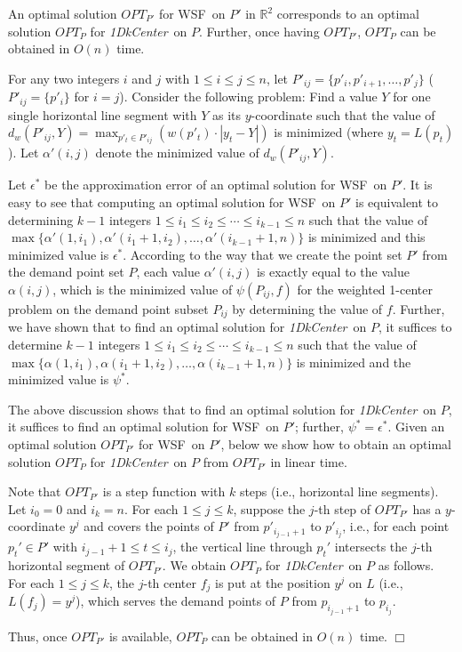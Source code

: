 \documentclass{llncs}
\newcommand{\OPT}{\mbox{$O\!P\!T$}}
\newenvironment{myproof}{\noindent {\textbf{Proof:}}\rm}{\hfill $\Box$\rm}
\def\calR{\mathbb{R}^2}
\def\wsf{WSF}
\def\problem{{\it 1DkCenter}}
\begin{document}
\begin{lemma}\label{lem:00}
An optimal solution $\OPT_{P'}$ for \wsf\ on $P'$ in $\calR$
corresponds to an optimal solution $\OPT_P$ for \problem\ on $P$.
Further, once having $\OPT_{P'}$, $\OPT_P$ can be obtained in $O(n)$
time.
\end{lemma}

\begin{myproof}
For any two integers $i$ and $j$ with $1\leq i\leq j\leq n$, let
$P'_{ij}=\{p'_i,p'_{i+1},\ldots,p'_j\}$ ($P'_{ij}=\{p'_i\}$ for
$i=j$). Consider the following problem: Find a value $Y$ for one
single horizontal line segment with $Y$ as its $y$-coordinate such
that the value of $d_w(P'_{ij},Y)=\max_{p'_t\in
P'_{ij}}(w(p'_t)\cdot |y_t-Y|)$ is minimized (where $y_t=L(p_t)$).
Let $\alpha'(i,j)$ denote the minimized value of $d_w(P'_{ij},Y)$.

Let $\epsilon^*$ be the approximation error of an optimal solution
for \wsf\ on $P'$. It is easy to see that computing an optimal
solution for \wsf\ on $P'$ is equivalent to determining $k-1$
integers $1\leq i_1\leq i_2\leq \cdots\leq i_{k-1}\leq n$ such that
the value of $\max\{\alpha'(1,i_1),\alpha'(i_1+1,i_2),\ldots,
\alpha'(i_{k-1}+1,n)\}$ is minimized and this minimized value is
$\epsilon^*$.
According to the way that we create the point set $P'$ from the
demand point set $P$, each value $\alpha'(i,j)$ is exactly equal to
the value $\alpha(i,j)$, which is the minimized value of
$\psi(P_{ij},f)$ for the weighted 1-center problem on the demand
point subset $P_{ij}$ by determining the value of $f$.
Further, we have shown that to find an optimal solution for
\problem\ on $P$, it suffices to determine $k-1$ integers $1\leq
i_1\leq i_2\leq \cdots\leq i_{k-1}\leq n$ such that the value of
$\max\{\alpha(1,i_1),\alpha(i_1+1,i_2),\ldots,
\alpha(i_{k-1}+1,n)\}$ is minimized and the minimized value is
$\psi^*$.

The above discussion shows that to find an optimal solution for
\problem\ on $P$, it suffices to find an optimal solution for \wsf\
on $P'$; further, $\psi^*=\epsilon^*$. Given an optimal solution
$\OPT_{P'}$ for \wsf\ on $P'$, below we show how to obtain an
optimal solution $\OPT_P$ for \problem\ on $P$ from $OPT_{P'}$ in linear time.

Note that $\OPT_{P'}$ is a step function with $k$ steps (i.e.,
horizontal line segments).  Let $i_0=0$ and $i_k=n$. For each $1\leq
j\leq k$, suppose the $j$-th step of $\OPT_{P'}$ has a
$y$-coordinate $y^j$ and covers the points of $P'$ from
$p'_{i_{j-1}+1}$ to $p'_{i_j}$, i.e., for each point $p_t'\in P'$
with $i_{j-1}+1\leq t\leq i_j$, the vertical line through $p_t'$
intersects the $j$-th horizontal segment of $\OPT_{P'}$.
We obtain $\OPT_P$ for \problem\ on $P$ as follows. For each $1\leq
j\leq k$, the $j$-th center $f_j$ is put at the position $y^j$ on
$L$ (i.e., $L(f_j)=y^j$), which serves the demand points of $P$ from
$p_{i_{j-1}+1}$ to $p_{i_j}$.

Thus, once $\OPT_{P'}$ is available, $\OPT_P$ can be obtained in
$O(n)$ time.
\end{myproof}
\end{document}
